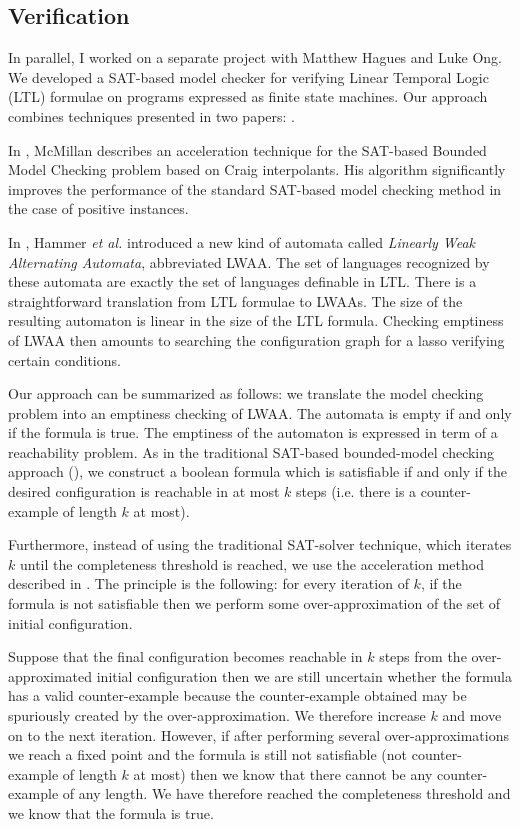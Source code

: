 \subsection{Verification}

In parallel, I worked on a separate project with Matthew Hagues and
Luke Ong. We developed a SAT-based  model checker for verifying
Linear Temporal Logic (LTL) formulae on programs expressed as finite
state machines. Our approach combines techniques presented in two
papers: \cite{hammer:truly, DBLP:conf/cav/McMillan03}.

In \cite{DBLP:conf/cav/McMillan03}, McMillan describes an
acceleration technique for the SAT-based Bounded Model Checking
problem based on Craig interpolants. His algorithm significantly
improves the performance of the standard SAT-based model checking
method in the case of positive instances.

In \citep{hammer:truly}, Hammer \emph{et al.} introduced a new kind
of automata called \emph{Linearly Weak Alternating Automata},
abbreviated LWAA. The set of languages recognized by these automata
are exactly the set of languages definable in LTL. There is a
straightforward translation from LTL formulae to LWAAs. The size of
the resulting automaton is linear in the size of the LTL formula.
Checking emptiness of LWAA then amounts to searching the
configuration graph for a lasso verifying certain conditions.

Our approach can be summarized as follows: we translate the model
checking problem into an emptiness checking of LWAA. The automata is
empty if and only if the formula is true. The emptiness of the
automaton is expressed in term of a reachability problem. As in the
traditional SAT-based bounded-model checking approach
(\cite{biere99symbolic}), we construct a boolean formula which is
satisfiable if and only if the desired configuration is reachable in
at most $k$ steps (i.e. there is a counter-example of length $k$ at
most).

Furthermore, instead of using the traditional SAT-solver technique,
which iterates $k$ until the completeness threshold is reached, we
use the acceleration method described in
\cite{DBLP:conf/cav/McMillan03}. The principle is the following: for
every iteration of $k$, if the formula is not satisfiable then we
perform some over-approximation of the set of initial configuration.

Suppose that the final configuration becomes reachable in $k$ steps
from the over-approximated initial configuration then we are still
uncertain whether the formula has a valid counter-example because
the counter-example obtained may be spuriously created by the
over-approximation. We therefore increase $k$ and move on to the
next iteration. However, if after performing several
over-approximations we reach a fixed point and the formula is still
not satisfiable (not counter-example of length $k$ at most) then we
know that there cannot be any counter-example of any length. We have
therefore reached the completeness threshold and we know that the
formula is true.


